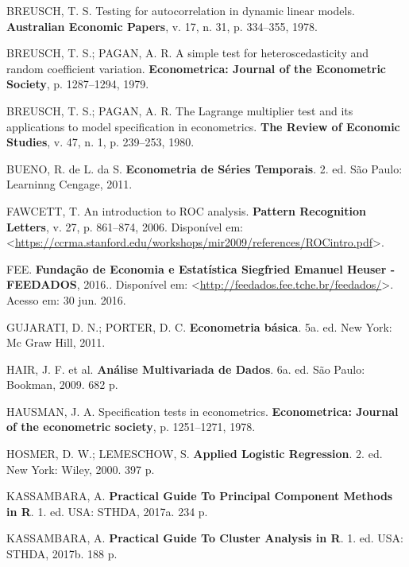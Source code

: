 \documentclass[12pt,brazil,oneside]{book}
\begin{document}
\hypertarget{refs}{}
\leavevmode\hypertarget{ref-breusch1978}{}%
BREUSCH, T. S. Testing for autocorrelation in dynamic linear models. \textbf{Australian Economic Papers}, v. 17, n. 31, p. 334--355, 1978.

\leavevmode\hypertarget{ref-breusch1979}{}%
BREUSCH, T. S.; PAGAN, A. R. A simple test for heteroscedasticity and random coefficient variation. \textbf{Econometrica: Journal of the Econometric Society}, p. 1287--1294, 1979.

\leavevmode\hypertarget{ref-breusch1980}{}%
BREUSCH, T. S.; PAGAN, A. R. The Lagrange multiplier test and its applications to model specification in econometrics. \textbf{The Review of Economic Studies}, v. 47, n. 1, p. 239--253, 1980.

\leavevmode\hypertarget{ref-Bueno2011}{}%
BUENO, R. de L. da S. \textbf{Econometria de Séries Temporais}. 2. ed. São Paulo: Learninng Cengage, 2011.

\leavevmode\hypertarget{ref-Fawcett2006}{}%
FAWCETT, T. An introduction to ROC analysis. \textbf{Pattern Recognition Letters}, v. 27, p. 861--874, 2006. Disponível em: \textless{}\url{https://ccrma.stanford.edu/workshops/mir2009/references/ROCintro.pdf}\textgreater{}.

\leavevmode\hypertarget{ref-FEE2016}{}%
FEE. \textbf{Fundação de Economia e Estatística Siegfried Emanuel Heuser - FEEDADOS}, 2016.. Disponível em: \textless{}\url{http://feedados.fee.tche.br/feedados/}\textgreater{}. Acesso em: 30 jun. 2016.

\leavevmode\hypertarget{ref-Gujarati2011}{}%
GUJARATI, D. N.; PORTER, D. C. \textbf{Econometria básica}. 5a. ed. New York: Mc Graw Hill, 2011.

\leavevmode\hypertarget{ref-Hair2009}{}%
HAIR, J. F. et al. \textbf{Análise Multivariada de Dados}. 6a. ed. São Paulo: Bookman, 2009. 682 p.

\leavevmode\hypertarget{ref-hausman1978}{}%
HAUSMAN, J. A. Specification tests in econometrics. \textbf{Econometrica: Journal of the econometric society}, p. 1251--1271, 1978.

\leavevmode\hypertarget{ref-Hosmer2000}{}%
HOSMER, D. W.; LEMESCHOW, S. \textbf{Applied Logistic Regression}. 2. ed. New York: Wiley, 2000. 397 p.

\leavevmode\hypertarget{ref-Kassambara2017b}{}%
KASSAMBARA, A. \textbf{Practical Guide To Principal Component Methods in R}. 1. ed. USA: STHDA, 2017a. 234 p.

\leavevmode\hypertarget{ref-Kassambara2017}{}%
KASSAMBARA, A. \textbf{Practical Guide To Cluster Analysis in R}. 1. ed. USA: STHDA, 2017b. 188 p.
\end{document}
